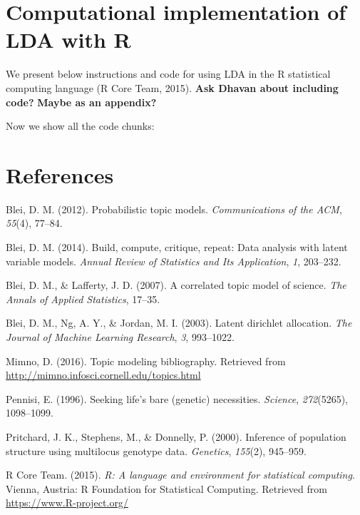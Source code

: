 \documentclass[12pt,]{article}
\newenvironment{Shaded}{\begin{snugshade}}{\end{snugshade}}
\newcommand{\KeywordTok}[1]{\textcolor[rgb]{0.13,0.29,0.53}{\textbf{{#1}}}}
\newcommand{\DataTypeTok}[1]{\textcolor[rgb]{0.13,0.29,0.53}{{#1}}}
\newcommand{\DecValTok}[1]{\textcolor[rgb]{0.00,0.00,0.81}{{#1}}}
\newcommand{\CommentTok}[1]{\textcolor[rgb]{0.56,0.35,0.01}{\textit{{#1}}}}
\newcommand{\OtherTok}[1]{\textcolor[rgb]{0.56,0.35,0.01}{{#1}}}
\newcommand{\NormalTok}[1]{{#1}}
\begin{document}
\section{Computational implementation of LDA with
R}\label{computational-implementation-of-lda-with-r}

We present below instructions and code for using LDA in the R
statistical computing language (R Core Team, 2015). \textbf{Ask Dhavan
about including code?} \textbf{Maybe as an appendix?}

Now we show all the code chunks:

\begin{Shaded}
\end{Shaded}

\section*{References}\label{references}

\hypertarget{refs}{}
\hypertarget{ref-blei2012probabilistic}{}
Blei, D. M. (2012). Probabilistic topic models. \emph{Communications of
the ACM}, \emph{55}(4), 77--84.

\hypertarget{ref-blei2014build}{}
Blei, D. M. (2014). Build, compute, critique, repeat: Data analysis with
latent variable models. \emph{Annual Review of Statistics and Its
Application}, \emph{1}, 203--232.

\hypertarget{ref-blei2007correlated}{}
Blei, D. M., \& Lafferty, J. D. (2007). A correlated topic model of
science. \emph{The Annals of Applied Statistics}, 17--35.

\hypertarget{ref-blei2003latent}{}
Blei, D. M., Ng, A. Y., \& Jordan, M. I. (2003). Latent dirichlet
allocation. \emph{The Journal of Machine Learning Research}, \emph{3},
993--1022.

\hypertarget{ref-mimno2016topic}{}
Mimno, D. (2016). Topic modeling bibliography. Retrieved from
\url{http://mimno.infosci.cornell.edu/topics.html}

\hypertarget{ref-pennisi1996seeking}{}
Pennisi, E. (1996). Seeking life's bare (genetic) necessities.
\emph{Science}, \emph{272}(5265), 1098--1099.

\hypertarget{ref-pritchard2000inference}{}
Pritchard, J. K., Stephens, M., \& Donnelly, P. (2000). Inference of
population structure using multilocus genotype data. \emph{Genetics},
\emph{155}(2), 945--959.

\hypertarget{ref-r2015}{}
R Core Team. (2015). \emph{R: A language and environment for statistical
computing}. Vienna, Austria: R Foundation for Statistical Computing.
Retrieved from \url{https://www.R-project.org/}
\end{document}
